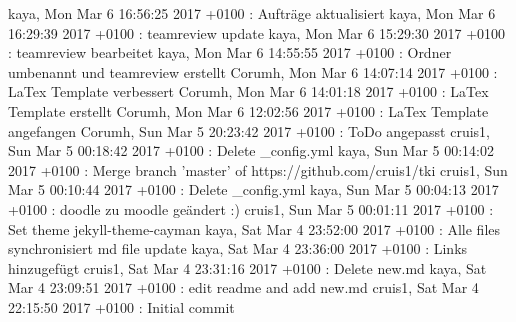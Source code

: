 kaya, Mon Mar 6 16:56:25 2017 +0100 : Aufträge aktualisiert
kaya, Mon Mar 6 16:29:39 2017 +0100 : teamreview update
kaya, Mon Mar 6 15:29:30 2017 +0100 : teamreview bearbeitet
kaya, Mon Mar 6 14:55:55 2017 +0100 : Ordner umbenannt und teamreview erstellt
Corumh, Mon Mar 6 14:07:14 2017 +0100 : LaTex Template verbessert
Corumh, Mon Mar 6 14:01:18 2017 +0100 : LaTex Template erstellt
Corumh, Mon Mar 6 12:02:56 2017 +0100 : LaTex Template angefangen
Corumh, Sun Mar 5 20:23:42 2017 +0100 : ToDo angepasst
cruis1, Sun Mar 5 00:18:42 2017 +0100 : Delete _config.yml
kaya, Sun Mar 5 00:14:02 2017 +0100 : Merge branch 'master' of https://github.com/cruis1/tki
cruis1, Sun Mar 5 00:10:44 2017 +0100 : Delete _config.yml
kaya, Sun Mar 5 00:04:13 2017 +0100 : doodle zu moodle geändert :)
cruis1, Sun Mar 5 00:01:11 2017 +0100 : Set theme jekyll-theme-cayman
kaya, Sat Mar 4 23:52:00 2017 +0100 : Alle files synchronisiert md file update
kaya, Sat Mar 4 23:36:00 2017 +0100 : Links hinzugefügt
cruis1, Sat Mar 4 23:31:16 2017 +0100 : Delete new.md
kaya, Sat Mar 4 23:09:51 2017 +0100 : edit readme and add new.md
cruis1, Sat Mar 4 22:15:50 2017 +0100 : Initial commit


